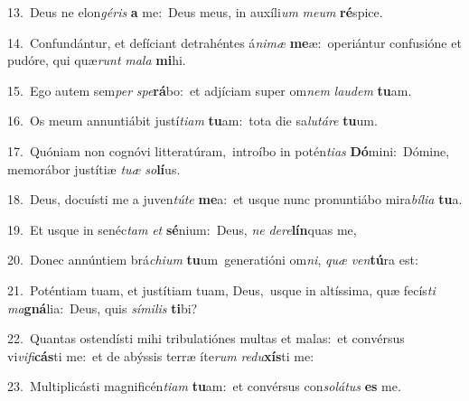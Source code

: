 {\numbfont\textcolor{\numbcolor}{13.}}~Deus ne elon\-\textit{gé}\-\textit{ris} \textbf{a} me:~\star Deus meus, in auxíli\textit{um} \textit{me}\-\textit{um} \textbf{ré}\-spice.\par
{\numbfont\textcolor{\numbcolor}{14.}}~Confundántur, et defíciant detrahéntes á\-\textit{ni}\-\textit{mæ} \textbf{me}\-æ:~\star operiántur confusióne et pudóre, qui quæ\textit{runt} \textit{ma}\-\textit{la} \textbf{mi}\-hi.\par
{\numbfont\textcolor{\numbcolor}{15.}}~Ego autem sem\textit{per} \textit{spe}\-\textbf{rá}bo:~\star et adjíciam super om\textit{nem} \textit{lau}\-\textit{dem} \textbf{tu}\-am.\par
{\numbfont\textcolor{\numbcolor}{16.}}~Os meum annuntiábit justí\-\textit{ti}\-\textit{am} \textbf{tu}\-am:~\star tota die sa\-\textit{lu}\-\textit{tá}\textit{re} \textbf{tu}\-um.\par
{\numbfont\textcolor{\numbcolor}{17.}}~Quóniam non cognóvi litteratúram,~\dagger introíbo in potén\-\textit{ti}\-\textit{as} \textbf{Dó}\-mini:~\star Dómine, memorábor justítiæ \textit{tu}\-\textit{æ} \textit{so}\-\textbf{lí}us.\par
{\numbfont\textcolor{\numbcolor}{18.}}~Deus, docuísti me a juven\-\textit{tú}\-\textit{te} \textbf{me}\-a:~\star et usque nunc pronuntiábo mira\-\textit{bí}\-\textit{li}\textit{a} \textbf{tu}\-a.\par
{\numbfont\textcolor{\numbcolor}{19.}}~Et usque in senéc\textit{tam} \textit{et} \textbf{sé}\-nium:~\star Deus, \textit{ne} \textit{de}\-\textit{re}\textbf{lín}quas me,\par
{\numbfont\textcolor{\numbcolor}{20.}}~Donec annúntiem brá\-\textit{chi}\-\textit{um} \textbf{tu}\-um~\star generatióni om\-\textit{ni}\-, \textit{quæ} \textit{ven}\-\textbf{tú}ra est:\par
{\numbfont\textcolor{\numbcolor}{21.}}~Poténtiam tuam, et justítiam tuam, Deus,~\dagger usque in altíssima, quæ fecís\textit{ti} \textit{ma}\-\textbf{gná}lia:~\star Deus, quis \textit{sí}\-\textit{mi}\textit{lis} \textbf{ti}\-bi?\par
{\numbfont\textcolor{\numbcolor}{22.}}~Quantas ostendísti mihi tribulatiónes multas et malas:~\dagger et convérsus vi\-\textit{vi}\-\textit{fi}\textbf{cás}ti me:~\star et de abýssis terræ íte\textit{rum} \textit{re}\-\textit{du}\textbf{xís}ti me:\par
{\numbfont\textcolor{\numbcolor}{23.}}~Multiplicásti magnificén\-\textit{ti}\-\textit{am} \textbf{tu}\-am:~\star et convérsus con\-\textit{so}\-\textit{lá}\textit{tus} \textbf{es} me.\par
